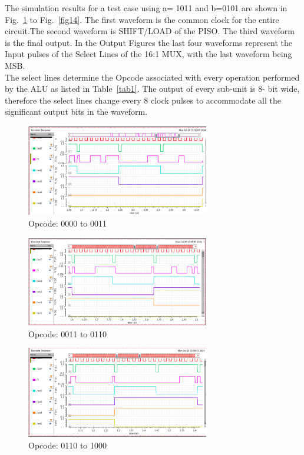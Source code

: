 \documentclass[conference]{IEEEtran}
\begin{document}
The simulation results for a test case using  a=  1011 and b=0101 are shown in Fig.~\ref{fig10} to Fig.~\ref{fig14}. The first waveform is the common clock for the entire circuit.The second waveform is SHIFT/LOAD of the PISO. The third waveform is the final output. In the Output Figures the last four waveforms represent the Input pulses of the Select Lines of the 16:1 MUX, with the last waveform being MSB.\\
The select lines determine the Opcode associated with every operation performed by the ALU as listed in Table~\ref{tab1}. The output of every sub-unit is 8- bit wide, therefore the select lines change every 8 clock pulses to accommodate all the significant output bits in the waveform.
\begin{figure}[htbp]
\centerline{\includegraphics[width=8cm,keepaspectratio,]{"Opcode_0000_0011.png"}}
\caption{Opcode: 0000 to 0011 }
\label{fig10}
\end{figure}
\begin{figure}[htbp]
\centerline{\includegraphics[width=8cm,keepaspectratio,]{"Opcode_0011_0110.png"}}
\caption{Opcode: 0011 to 0110}
\label{fig11}
\end{figure}
\begin{figure}[htbp]
\centerline{\includegraphics[width=8cm,keepaspectratio,]{"Opcode_0110_1000.png"}}
\caption{Opcode: 0110 to 1000}
\label{fig12}
\end{figure} \\
\end{document}

